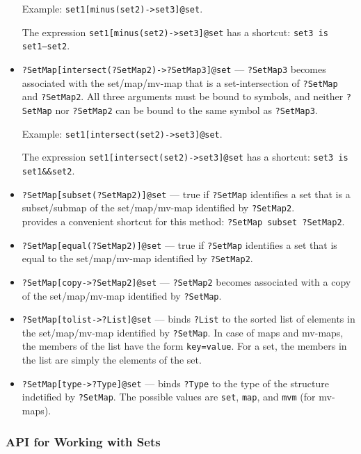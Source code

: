 \begin{itemize}
  Example: \texttt{set1[minus(set2)->set3]@\bs{}set}. 

  The expression \texttt{set1[minus(set2)->set3]@\bs{}set} has a shortcut:  \texttt{set3 \bs{}is set1--set2}.   

  \item \texttt{?SetMap[intersect(?SetMap2)->?SetMap3]@\bs{}set} --- \texttt{?SetMap3}
  becomes associated with the set/map/mv-map that is a set-intersection of \texttt{?SetMap}
  and \texttt{?SetMap2}. All three arguments must be bound to symbols, and
  neither \texttt{?SetMap} nor
  \texttt{?SetMap2} can be bound to the same symbol as
  \texttt{?SetMap3}.

  Example: \texttt{set1[intersect(set2)->set3]@\bs{}set}. 

  The expression \texttt{set1[intersect(set2)->set3]@\bs{}set} has a shortcut:  \texttt{set3 \bs{}is set1\&\&set2}. 

\item \texttt{?SetMap[subset(?SetMap2)]@\bs{}set} --- true if \texttt{?SetMap}
  identifies a set that is a subset/submap of the set/map/mv-map identified by
  \texttt{?SetMap2}.
  \\
  \ERGO provides a convenient shortcut for this method: \texttt{?SetMap
  \bs{}subset ?SetMap2}.  
\item \texttt{?SetMap[equal(?SetMap2)]@\bs{}set} --- true if \texttt{?SetMap}
  identifies a set that is equal to the set/map/mv-map identified by \texttt{?SetMap2}.
\item \texttt{?SetMap[copy->?SetMap2]@\bs{}set} --- \texttt{?SetMap2} becomes
  associated with a copy of the set/map/mv-map identified by \texttt{?SetMap}.  
\item \texttt{?SetMap[tolist->?List]@\bs{}set} --- binds \texttt{?List} to
  the sorted list of elements in the set/map/mv-map identified by
  \texttt{?SetMap}. In case of maps and mv-maps, the members of the
  list have the form \texttt{key=value}.  For a set, the members in
  the list are simply the elements of the set.
\item \texttt{?SetMap[type->?Type]@\bs{}set} --- binds \texttt{?Type} to
  the type of the structure indetified by \texttt{?SetMap}. The possible
  values are \texttt{set}, \texttt{map},    and \texttt{mvm} (for mv-maps). 
\end{itemize}

\subsubsection{API for Working with Sets} \label{sec-api-set}

